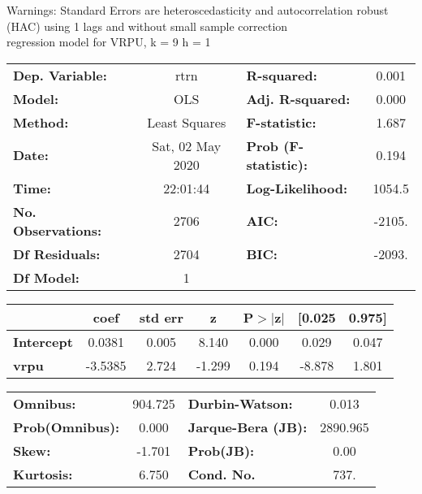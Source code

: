 Warnings: \newline
 [1] Standard Errors are heteroscedasticity and autocorrelation robust (HAC) using 1 lags and without small sample correction\\ 

regression model for VRPU, k = 9 h = 1\begin{center}
\begin{tabular}{lclc}
\toprule
\textbf{Dep. Variable:}    &       rtrn       & \textbf{  R-squared:         } &     0.001   \\
\textbf{Model:}            &       OLS        & \textbf{  Adj. R-squared:    } &     0.000   \\
\textbf{Method:}           &  Least Squares   & \textbf{  F-statistic:       } &     1.687   \\
\textbf{Date:}             & Sat, 02 May 2020 & \textbf{  Prob (F-statistic):} &    0.194    \\
\textbf{Time:}             &     22:01:44     & \textbf{  Log-Likelihood:    } &    1054.5   \\
\textbf{No. Observations:} &        2706      & \textbf{  AIC:               } &    -2105.   \\
\textbf{Df Residuals:}     &        2704      & \textbf{  BIC:               } &    -2093.   \\
\textbf{Df Model:}         &           1      & \textbf{                     } &             \\
\bottomrule
\end{tabular}
\begin{tabular}{lcccccc}
                   & \textbf{coef} & \textbf{std err} & \textbf{z} & \textbf{P$> |$z$|$} & \textbf{[0.025} & \textbf{0.975]}  \\
\midrule
\textbf{Intercept} &       0.0381  &        0.005     &     8.140  &         0.000        &        0.029    &        0.047     \\
\textbf{vrpu}      &      -3.5385  &        2.724     &    -1.299  &         0.194        &       -8.878    &        1.801     \\
\bottomrule
\end{tabular}
\begin{tabular}{lclc}
\textbf{Omnibus:}       & 904.725 & \textbf{  Durbin-Watson:     } &    0.013  \\
\textbf{Prob(Omnibus):} &   0.000 & \textbf{  Jarque-Bera (JB):  } & 2890.965  \\
\textbf{Skew:}          &  -1.701 & \textbf{  Prob(JB):          } &     0.00  \\
\textbf{Kurtosis:}      &   6.750 & \textbf{  Cond. No.          } &     737.  \\
\bottomrule
\end{tabular}
\end{center}

